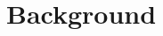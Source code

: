 \documentclass[twoside,its]{bossthesis}
\makeatletter
\newif\ifshowhighlights
\def\hl@ulpreamble{\SOUL@hlpreamble
  \hl@lnht=-\SOUL@uldp \advance\hl@lnht by \hl@lnthick}
\def\hl@ulleaders{\xleaders\hbox to 1pt{%
  \rlap{\vrule width 1.2pt height \SOUL@ulht depth \SOUL@uldp}%
  \rlap{\textcolor{todoline}{\vrule width 1.2pt height \hl@lnht depth \SOUL@uldp}}\hss}}
\DeclareRobustCommand*\texthlul{\SOUL@hlsetup
  \let\SOUL@preamble\hl@ulpreamble \let\SOUL@ulleaders\hl@ulleaders \SOUL@}
\newcommand{\hl@plain}[2]{{\sethlcolor{#1}\hl{#2}}}
\newcommand{\hl@marked}[2]{{\sethlcolor{#1}\texthlul{#2}}}
\newcommand{\hl@off}[2]{#2}
\newcommand{\hl@on}[2]{\@ifnextchar\todo{\hl@marked{#1}{#2}}{\hl@plain{#1}{#2}}}
\newcommand{\highlight}[2][yellow]{%
  \ifshowhighlights
    \expandafter\hl@on %
  \else
    \expandafter\hl@off
  \fi
  {#1}{#2}}
\makeatother
\begin{document}
\chapter{Background}
\label{ch:background}
%
%
%
%
\end{document}
